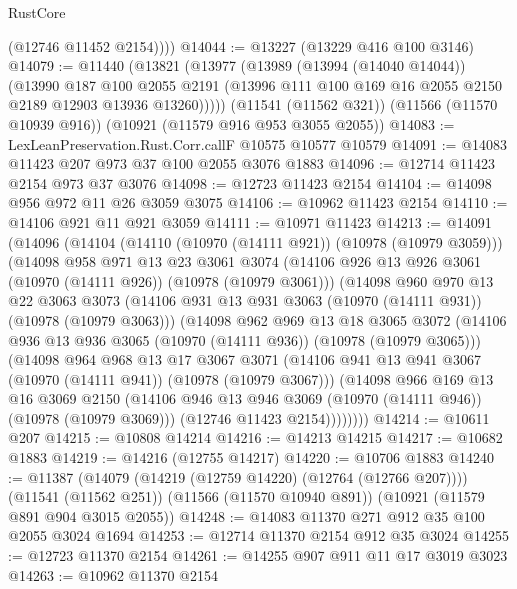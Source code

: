 \begin{lexlean}{RustCore}
\begin{coremodule}
          (@12746 @11452 @2154))))
@14044 := @13227 (@13229 @416 @100 @3146)
@14079 := @11440
    (@13821
      (@13977
        (@13989
          (@13994 (@14040 @14044))
          (@13990
            @187
            @100
            @2055
            @2191
            (@13996 @111 @100 @169 @16 @2055 @2150 @2189 @12903 @13936 @13260)))))
    (@11541 (@11562 @321))
    (@11566 (@11570 @10939 @916))
    (@10921 (@11579 @916 @953 @3055 @2055))
@14083 := LexLeanPreservation.Rust.Corr.callF @10575 @10577 @10579
@14091 := @14083 @11423 @207 @973 @37 @100 @2055 @3076 @1883
@14096 := @12714 @11423 @2154 @973 @37 @3076
@14098 := @12723 @11423 @2154
@14104 := @14098 @956 @972 @11 @26 @3059 @3075
@14106 := @10962 @11423 @2154
@14110 := @14106 @921 @11 @921 @3059
@14111 := @10971 @11423
@14213 := @14091
    (@14096
      (@14104
        (@14110 (@10970 (@14111 @921)) (@10978 (@10979 @3059)))
        (@14098
          @958
          @971
          @13
          @23
          @3061
          @3074
          (@14106 @926 @13 @926 @3061 (@10970 (@14111 @926)) (@10978 (@10979 @3061)))
          (@14098
            @960
            @970
            @13
            @22
            @3063
            @3073
            (@14106 @931 @13 @931 @3063 (@10970 (@14111 @931)) (@10978 (@10979 @3063)))
            (@14098
              @962
              @969
              @13
              @18
              @3065
              @3072
              (@14106 @936 @13 @936 @3065 (@10970 (@14111 @936)) (@10978 (@10979 @3065)))
              (@14098
                @964
                @968
                @13
                @17
                @3067
                @3071
                (@14106 @941 @13 @941 @3067 (@10970 (@14111 @941)) (@10978 (@10979 @3067)))
                (@14098
                  @966
                  @169
                  @13
                  @16
                  @3069
                  @2150
                  (@14106 @946 @13 @946 @3069 (@10970 (@14111 @946)) (@10978 (@10979 @3069)))
                  (@12746 @11423 @2154))))))))
@14214 := @10611 @207
@14215 := @10808 @14214
@14216 := @14213 @14215
@14217 := @10682 @1883
@14219 := @14216 (@12755 @14217)
@14220 := @10706 @1883
@14240 := @11387
    (@14079 (@14219 (@12759 @14220) (@12764 (@12766 @207))))
    (@11541 (@11562 @251))
    (@11566 (@11570 @10940 @891))
    (@10921 (@11579 @891 @904 @3015 @2055))
@14248 := @14083 @11370 @271 @912 @35 @100 @2055 @3024 @1694
@14253 := @12714 @11370 @2154 @912 @35 @3024
@14255 := @12723 @11370 @2154
@14261 := @14255 @907 @911 @11 @17 @3019 @3023
@14263 := @10962 @11370 @2154

\end{coremodule}
\end{lexlean}
